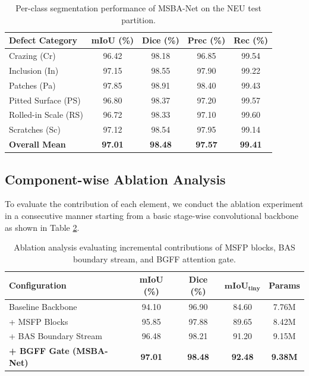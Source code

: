 \documentclass{ieeeaccess}
\begin{document}
\begin{table}[!t]
\centering
\setlength{\tabcolsep}{3.5pt}
\fontsize{8pt}{10pt}\selectfont
\caption{Per-class segmentation performance of MSBA-Net on the NEU test partition.}
\label{tab:classwise}
\begin{tabular*}{\columnwidth}{@{\extracolsep{\fill}}lcccc@{}}
\toprule
\textbf{Defect Category} & \textbf{mIoU (\%)} & \textbf{Dice (\%)} & \textbf{Prec (\%)} & \textbf{Rec (\%)} \\
\midrule
Crazing (Cr) & 96.42 & 98.18 & 96.85 & 99.54 \\
Inclusion (In) & 97.15 & 98.55 & 97.90 & 99.22 \\
Patches (Pa) & 97.85 & 98.91 & 98.40 & 99.43 \\
Pitted Surface (PS) & 96.80 & 98.37 & 97.20 & 99.57 \\
Rolled-in Scale (RS) & 96.72 & 98.33 & 97.10 & 99.60 \\
Scratches (Sc) & 97.12 & 98.54 & 97.95 & 99.14 \\
\midrule
\textbf{Overall Mean} & \textbf{97.01} & \textbf{98.48} & \textbf{97.57} & \textbf{99.41} \\
\bottomrule
\end{tabular*}
\end{table}

\subsection{Component-wise Ablation Analysis}
To evaluate the contribution of each element, we conduct the ablation experiment in a consecutive manner starting from a basic stage-wise convolutional backbone as shown in Table \ref{tab:ablation}.

\begin{table}[!t]
\centering
\setlength{\tabcolsep}{2.5pt}
\fontsize{8pt}{10pt}\selectfont
\caption{Ablation analysis evaluating incremental contributions of MSFP blocks, BAS boundary stream, and BGFF attention gate.}
\label{tab:ablation}
\begin{tabular*}{\columnwidth}{@{\extracolsep{\fill}}lcccc@{}}
\toprule
\textbf{Configuration} & \textbf{mIoU (\%)} & \textbf{Dice (\%)} & $\mathbf{mIoU}_{\mathbf{tiny}}$ & \textbf{Params} \\
\midrule
Baseline Backbone & 94.10 & 96.90 & 84.60 & 7.76M \\
+ MSFP Blocks & 95.85 & 97.88 & 89.65 & 8.42M \\
+ BAS Boundary Stream & 96.48 & 98.21 & 91.20 & 9.15M \\
\textbf{+ BGFF Gate (MSBA-Net)} & \textbf{97.01} & \textbf{98.48} & \textbf{92.48} & \textbf{9.38M} \\
\bottomrule
\end{tabular*}
\end{table}
\end{document}
